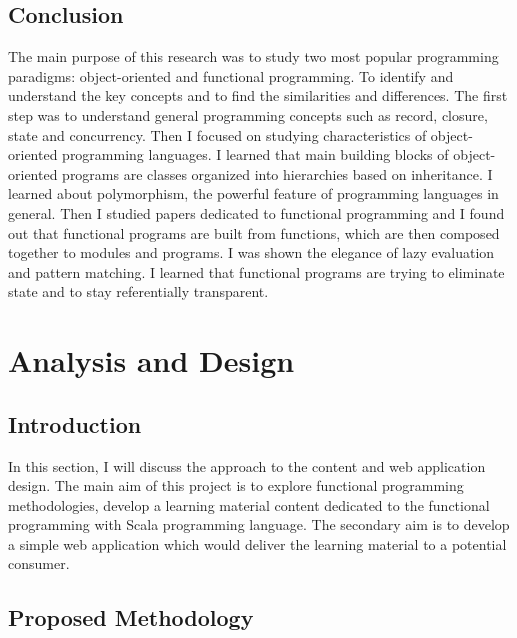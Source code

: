 \documentclass[12pt,twoside,a4paper]{report}
\begin{document}
\section{Conclusion}\label{2.6}
The main purpose of this research was to study two most popular programming paradigms: object-oriented and functional programming. To identify and understand the key concepts and to
find the similarities and differences. The first step was to understand general programming concepts such as record, closure, state and concurrency. Then I focused on studying characteristics of object-oriented programming languages. I learned that main building blocks of object-oriented programs are classes organized into hierarchies based on inheritance. I learned about polymorphism, the powerful feature of programming languages in general. Then I studied papers dedicated to functional programming and I found out that functional programs are built from functions, which are then composed together to modules and programs. I was shown the elegance of lazy evaluation and pattern matching. I learned that functional programs are trying to eliminate state and to stay referentially transparent.

\chapter{Analysis and Design}\label{3}
\section{Introduction}\label{3.1}
In this section, I will discuss the approach to the content and web application design. The main aim of this project is to explore functional programming methodologies, develop a learning material content dedicated to the functional programming with Scala programming language. The secondary aim is to develop a simple web application which would deliver the learning material to a potential consumer. 
\section{Proposed Methodology}\label{3.2}
\end{document}
